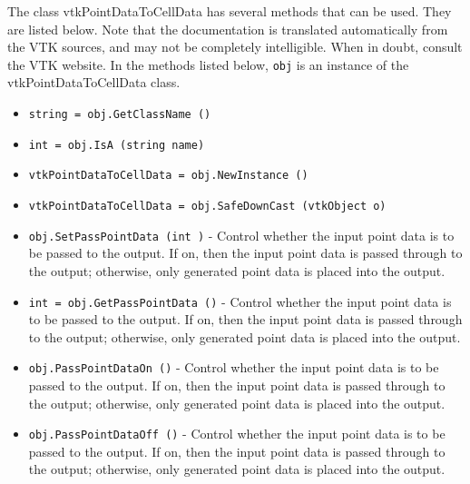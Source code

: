 The class vtkPointDataToCellData has several methods that can be used.
  They are listed below.
Note that the documentation is translated automatically from the VTK sources,
and may not be completely intelligible.  When in doubt, consult the VTK website.
In the methods listed below, \verb|obj| is an instance of the vtkPointDataToCellData class.
\begin{itemize}
\item  \verb|string = obj.GetClassName ()|

\item  \verb|int = obj.IsA (string name)|

\item  \verb|vtkPointDataToCellData = obj.NewInstance ()|

\item  \verb|vtkPointDataToCellData = obj.SafeDownCast (vtkObject o)|

\item  \verb|obj.SetPassPointData (int )| -  Control whether the input point data is to be passed to the output. If
 on, then the input point data is passed through to the output; otherwise,
 only generated point data is placed into the output.

\item  \verb|int = obj.GetPassPointData ()| -  Control whether the input point data is to be passed to the output. If
 on, then the input point data is passed through to the output; otherwise,
 only generated point data is placed into the output.

\item  \verb|obj.PassPointDataOn ()| -  Control whether the input point data is to be passed to the output. If
 on, then the input point data is passed through to the output; otherwise,
 only generated point data is placed into the output.

\item  \verb|obj.PassPointDataOff ()| -  Control whether the input point data is to be passed to the output. If
 on, then the input point data is passed through to the output; otherwise,
 only generated point data is placed into the output.

\end{itemize}
